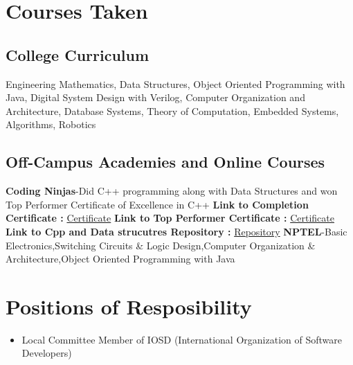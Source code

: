 \documentclass[a4paper,12pt]{article}
\begin{document}
\section*{Courses Taken}
\subsection*{College Curriculum}
Engineering Mathematics,
Data Structures,
Object Oriented Programming with Java,
Digital System Design with Verilog,
Computer Organization and Architecture,
Database Systems,
Theory of Computation,
Embedded Systems,
Algorithms,
Robotics
\subsection*{Off-Campus Academies and Online Courses}
\textbf{Coding Ninjas}-Did C++ programming along with Data Structures
and won Top Performer Certificate of Excellence in C++
\newline
\textbf{Link to Completion Certificate :} \href{https://github.com/teetangh/Kaustav-All-Certifications/blob/master/Programming/Coding%20Ninjas/Coding%20Ninjas%20Cpp%20Completion%20Certificate.pdf}{Certificate}
\newline
\textbf{Link to Top Performer Certificate :} \href{https://github.com/teetangh/Kaustav-All-Certifications/blob/master/Programming/Coding%20Ninjas/Coding%20Ninjas%20Cpp%20Top%20Performer%20Certificate.pdf}{Certificate}
\newline
\textbf{Link to Cpp and Data strucutres Repository :} \href{https://github.com/teetangh/Kaustav-Competitive-Coding}{Repository}
\newline
\textbf{NPTEL}-Basic Electronics,Switching Circuits \& Logic Design,Computer Organization \& Architecture,Object Oriented Programming with Java

\section*{Positions of Resposibility}
\begin{itemize}
    \item Local Committee Member of IOSD
          (International Organization of Software Developers)
\end{itemize}
\end{document}

